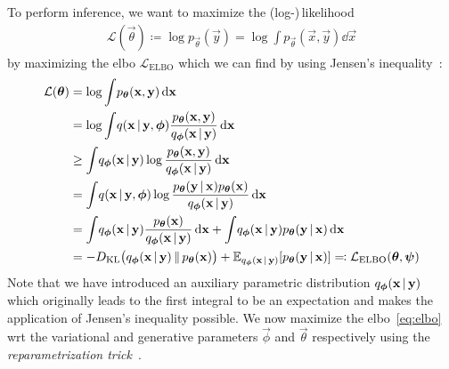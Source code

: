 	To perform inference, we want to maximize the (log-)\,likelihood
	\begin{align*}
		\mathcal{L}(\vec{\theta}) \coloneqq \log p_{\vec{\theta}}(\vec{y}) = \log \int\! p_{\vec{\theta}}(\vec{x}, \vec{y}) \dd{\vec{x}}
	\end{align*}
	by maximizing the \ac{elbo} \( \mathcal{L}_\mathrm{ELBO} \) which we can find by using Jensen's inequality~\cite{jensenFonctionsConvexesInegalites1906}:
	\begin{align}
		\mathcal{L}(\vec{\theta})
			&= \log \int\! p_{\vec{\theta}}(\vec{x}, \vec{y}) \dd{\vec{x}}  \nonumber \\
			&= \log \int\! q(\vec{x} \given \vec{y}, \vec{\phi}) \frac{p_{\vec{\theta}}(\vec{x}, \vec{y})}{q_{\vec{\phi}}(\vec{x} \given \vec{y})} \dd{\vec{x}}  \nonumber \\
			&\geq \int\! q_{\vec{\phi}}(\vec{x} \given \vec{y}) \log \frac{p_{\vec{\theta}}(\vec{x}, \vec{y})}{q_{\vec{\phi}}(\vec{x} \given \vec{y})} \dd{\vec{x}}  \nonumber \\
			&= \int\! q(\vec{x} \given \vec{y}, \vec{\phi}) \log \frac{p_{\vec{\theta}}(\vec{y} \given \vec{x}) p_{\vec{\theta}}(\vec{x})}{q_{\vec{\phi}}(\vec{x} \given \vec{y})} \dd{\vec{x}}  \nonumber \\
			&= \int\! q_{\vec{\phi}}(\vec{x} \given \vec{y}) \frac{p_{\vec{\theta}}(\vec{x})}{q_{\vec{\phi}}(\vec{x} \given \vec{y})} \dd{\vec{x}} + \int\! q_{\vec{\phi}}(\vec{x} \given \vec{y}) p_{\vec{\theta}}(\vec{y} \given \vec{x}) \dd{\vec{x}}  \nonumber \\
			&= -\KL{q_{\vec{\phi}}(\vec{x} \given \vec{y})}{p_{\vec{\theta}}(\vec{x})} + \E_{q_{\vec{\phi}}(\vec{x} \given \vec{y})}[p_{\vec{\theta}}(\vec{y} \given \vec{x})] \eqqcolon \mathcal{L}_\mathrm{ELBO}(\vec{\theta}, \vec{\psi})  \label{eq:elbo}
	\end{align}
	Note that we have introduced an auxiliary parametric distribution \( q_{\vec{\phi}}(\vec{x} \given \vec{y}) \) which originally leads to the first integral to be an expectation and makes the application of Jensen's inequality possible. We now maximize the \ac{elbo}~\eqref{eq:elbo} \ac{wrt} the variational and generative parameters \(\vec{\phi}\) and \(\vec{\theta}\) respectively using the \emph{reparametrization trick}~\cite{kingmaAutoEncodingVariationalBayes2014}.

